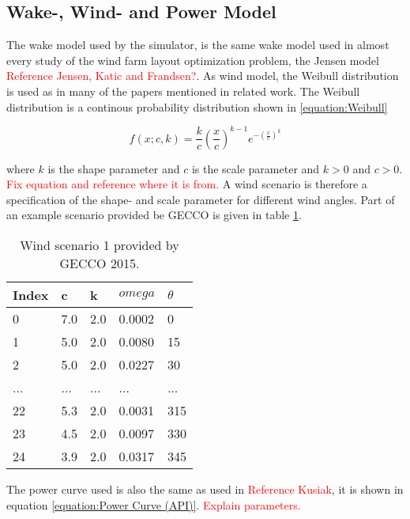 \subsection{Wake-, Wind- and Power Model}
The wake model used by the simulator, is the same wake model used in almost every study of the wind farm layout optimization problem, the Jensen model \textcolor{red}{Reference Jensen, Katic and Frandsen?}. As wind model, the Weibull distribution is used as in many of the papers mentioned in related work. The Weibull distribution is a continous probability distribution shown in \ref{equation:Weibull}


\begin{equation}
f(x; c, k)  = \frac{k}{c} \left( \frac{x}{c} \right)^{k-1} e^{- \left( \frac{x}{c} \right)^k }
\label{equation:Weibull}
\end{equation}


where $k$ is the shape parameter and $c$ is the scale parameter and $k > 0$ and $c > 0$. \textcolor{red}{Fix equation and reference where it is from.} A wind scenario is therefore a specification of the shape- and scale parameter for different wind angles. Part of an example scenario provided be GECCO is given in table \ref{Wind scenario 1}.


\begin{table}[h!]
\begin{center}
\caption{Wind scenario 1 provided by GECCO 2015.}
\label{Wind scenario 1}
\begin{tabular}{l|l|l|l|l}
\textbf{Index} & \textbf{c} & \textbf{k} & \textbf{$omega$} & \textbf{$\theta$} \\ 
\hline
0 & 7.0 & 2.0 & 0.0002 & 0 \\  
1 & 5.0 & 2.0 & 0.0080 & 15 \\ 
2 & 5.0 & 2.0 & 0.0227 & 30 \\ 
... & ... & ... & ... & ... \\ 
22 & 5.3 & 2.0 & 0.0031 & 315 \\ 
23 & 4.5 & 2.0 & 0.0097 & 330 \\ 
24 & 3.9 & 2.0 & 0.0317 & 345 \\ 
\end{tabular} 
\end{center}
\end{table}


\noindent The power curve used is also the same as used in \textcolor{red}{Reference Kusiak}, it is shown in equation \ref{equation:Power Curve (API)}. \textcolor{red}{Explain parameters.}


